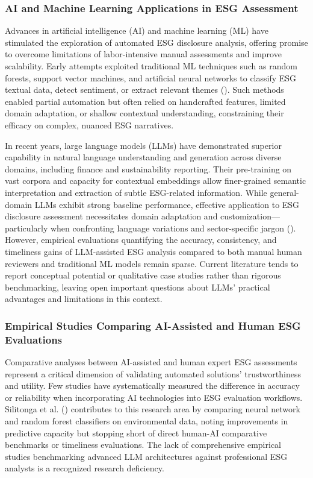 \documentclass[
  12pt,
]{article}
\begin{document}
\subsubsection{AI and Machine Learning Applications in ESG
Assessment}\label{ai-and-machine-learning-applications-in-esg-assessment}

Advances in artificial intelligence (AI) and machine learning (ML) have
stimulated the exploration of automated ESG disclosure analysis,
offering promise to overcome limitations of labor-intensive manual
assessments and improve scalability. Early attempts exploited
traditional ML techniques such as random forests, support vector
machines, and artificial neural networks to classify ESG textual data,
detect sentiment, or extract relevant themes
(). Such methods
enabled partial automation but often relied on handcrafted features,
limited domain adaptation, or shallow contextual understanding,
constraining their efficacy on complex, nuanced ESG narratives.

In recent years, large language models (LLMs) have demonstrated superior
capability in natural language understanding and generation across
diverse domains, including finance and sustainability reporting. Their
pre-training on vast corpora and capacity for contextual embeddings
allow finer-grained semantic interpretation and extraction of subtle
ESG-related information. While general-domain LLMs exhibit strong
baseline performance, effective application to ESG disclosure assessment
necessitates domain adaptation and customization---particularly when
confronting language variations and sector-specific jargon
(). However,
empirical evaluations quantifying the accuracy, consistency, and
timeliness gains of LLM-assisted ESG analysis compared to both manual
human reviewers and traditional ML models remain sparse. Current
literature tends to report conceptual potential or qualitative case
studies rather than rigorous benchmarking, leaving open important
questions about LLMs' practical advantages and limitations in this
context.

\subsubsection{Empirical Studies Comparing AI-Assisted and Human ESG
Evaluations}\label{empirical-studies-comparing-ai-assisted-and-human-esg-evaluations}

Comparative analyses between AI-assisted and human expert ESG
assessments represent a critical dimension of validating automated
solutions' trustworthiness and utility. Few studies have systematically
measured the difference in accuracy or reliability when incorporating AI
technologies into ESG evaluation workflows. Silitonga et al.
() contributes to this research area
by comparing neural network and random forest classifiers on
environmental data, noting improvements in predictive capacity but
stopping short of direct human-AI comparative benchmarks or timeliness
evaluations. The lack of comprehensive empirical studies benchmarking
advanced LLM architectures against professional ESG analysts is a
recognized research deficiency.
\end{document}
